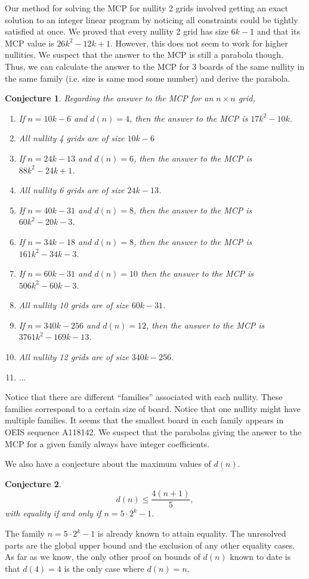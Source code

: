 \documentclass[a4paper]{article}
\newtheorem{conjecture}{Conjecture}
\begin{document}
	Our method for solving the MCP for nullity 2 grids involved getting an exact solution to an integer linear program by noticing all constraints could be tightly satisfied at once.
	We proved that every nullity 2 grid has size $6k-1$ and that its MCP value is $26k^2-12k+1$.
	However, this does not seem to work for higher nullities.
	We suspect that the answer to the MCP is still a parabola though.
	Thus, we can calculate the answer to the MCP for 3 boards of the same nullity in the same family (i.e. size is same mod some number) and derive the parabola.
	\begin{conjecture}
		Regarding the answer to the MCP for an $n \times n$ grid,
		\begin{enumerate}
			\item
				If $n = 10k - 6$ and $d(n) = 4$, then the answer to the MCP is $17k^2 - 10k$.
			\item
				All nullity 4 grids are of size $10k - 6$
			\item
				If $n = 24k - 13$ and $d(n) = 6$, then the answer to the MCP is $88k^2 - 24k + 1$.
			\item
				All nullity 6 grids are of size $24k-13$.
			\item
				If $n = 40k - 31$ and $d(n) = 8$, then the answer to the MCP is $60k^2 - 20k - 3$.
			 \item
				If $n = 34k - 18$ and $d(n) = 8$, then the answer to the MCP is $161k^2 - 34k - 3$.
			 \item
				If $n = 60k - 31$ and $d(n) = 10$ then the answer to the MCP is $506k^2 - 60k - 3$.
			 \item
				All nullity 10 grids are of size $60k - 31$.
			 \item
				If $n = 340k - 256$ and $d(n) = 12$, then the answer to the MCP is $3761k^2 - 169k - 13$.
			 \item
				All nullity 12 grids are of size $340k - 256$.
			 \item
				$\ldots$
		\end{enumerate}
	\end{conjecture}
	Notice that there are different ``families'' associated with each nullity.
	These families correspond to a certain size of board.
	Notice that one nullity might have multiple families.
	It seems that the smallest board in each family appears in OEIS sequence A118142.
	We suspect that the parabolas giving the answer to the MCP for a given family always have integer coefficients.

	We also have a conjecture about the maximum values of $d(n)$.
	\begin{conjecture}
		\begin{equation*}
			d(n) \le \frac{4(n+1)}{5},
		\end{equation*}
		with equality if and only if $n = 5 \cdot 2^k - 1$.
	\end{conjecture}
	The family $n=5\cdot2^k-1$ is already known to attain equality.
	The unresolved parts are the global upper bound and the exclusion of any other equality cases.
	As far as we know, the only other proof on bounds of $d(n)$ known to date is that $d(4) = 4$ is the only case where $d(n) = n$.
\end{document}
